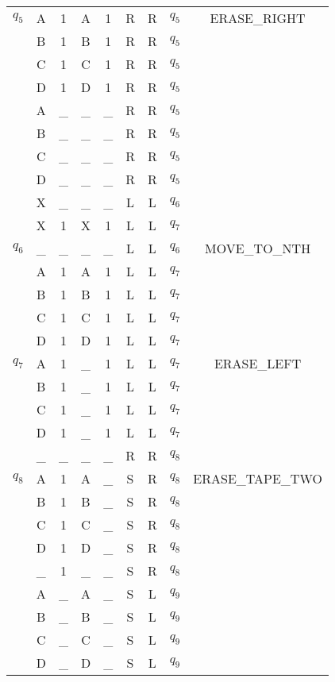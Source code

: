 \begin{table}
\begin{longtable}{| c | c c | c c | c c | c | c |}
    \hline
    $q_5$ & A & 1 & A & 1 & R & R & $q_5$ & ERASE\_RIGHT \\
         & B & 1 & B & 1 & R & R & $q_5$ & \\
         & C & 1 & C & 1 & R & R & $q_5$ & \\
         & D & 1 & D & 1 & R & R & $q_5$ & \\
         & A & \_ & \_ & \_ & R & R & $q_5$ & \\
         & B & \_ & \_ & \_ & R & R & $q_5$ & \\
         & C & \_ & \_ & \_ & R & R & $q_5$ & \\
         & D & \_ & \_ & \_ & R & R & $q_5$ & \\
         & X & \_ & \_ & \_ & L & L & $q_6$ & \\
         & X & 1 & X & 1 & L & L & $q_7$ & \\
    \hline
    $q_6$ & \_ & \_ & \_ & \_ & L & L & $q_6$ & MOVE\_TO\_NTH \\
         & A & 1 & A & 1 & L & L & $q_7$ & \\
         & B & 1 & B & 1 & L & L & $q_7$ & \\
         & C & 1 & C & 1 & L & L & $q_7$ & \\
         & D & 1 & D & 1 & L & L & $q_7$ & \\
    \hline
    $q_7$ & A & 1 & \_ & 1 & L & L & $q_7$ & ERASE\_LEFT \\
         & B & 1 & \_ & 1 & L & L & $q_7$ & \\
         & C & 1 & \_ & 1 & L & L & $q_7$ & \\
         & D & 1 & \_ & 1 & L & L & $q_7$ & \\
         & \_ & \_ & \_ & \_ & R & R & $q_8$ & \\
    \hline
    $q_8$ & A & 1 & A & \_ & S & R & $q_8$ & ERASE\_TAPE\_TWO \\
         & B & 1 & B & \_ & S & R & $q_8$ & \\
         & C & 1 & C & \_ & S & R & $q_8$ & \\
         & D & 1 & D & \_ & S & R & $q_8$ & \\
         & \_ & 1 & \_ & \_ & S & R & $q_8$ & \\
         & A & \_ & A & \_ & S & L & $q_9$ & \\
         & B & \_ & B & \_ & S & L & $q_9$ & \\
         & C & \_ & C & \_ & S & L & $q_9$ & \\
         & D & \_ & D & \_ & S & L & $q_9$ & \\

\end{longtable}
\end{table}
